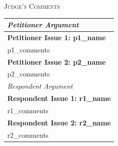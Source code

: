 \documentclass{article}
\begin{document}
\newpage

\begin{center}
    \vspace{1em}
    {\large\textsc{Judge's Comments}}
\end{center}

\begin{table}[h!]
\centering
\renewcommand{\arraystretch}{1.8}
\begin{tabular}{|p{\linewidth}|}
\hline
\rowcolor{yellow!30}
\textit{Petitioner Argument}\\
\hline
\textbf{Petitioner Issue 1: {{ p1_name }}}\\
\hline
{{ p1_comments }}\\
\hline
\textbf{Petitioner Issue 2: {{ p2_name }}}\\
\hline
{{ p2_comments }}\\
\hline
\rowcolor{cyan!20}
\textit{Respondent Argument}\\
\hline
\textbf{Respondent Issue 1: {{ r1_name }}}\\
\hline
{{ r1_comments }}\\
\hline
\textbf{Respondent Issue 2: {{ r2_name }}}\\
\hline
{{ r2_comments }}\\
\hline
\end{tabular}
\end{table}
\end{document}
